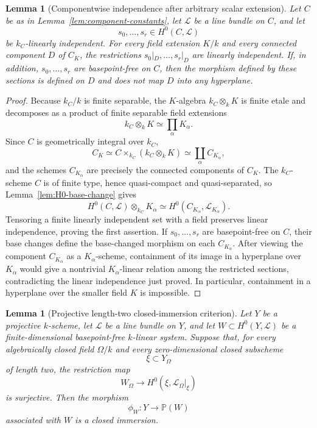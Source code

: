 \documentclass{lms}
\newtheorem{lemma}[theorem]{Lemma}
\newcommand{\PP}{\mathbb P}
\begin{document}
\begin{lemma}[Componentwise independence after arbitrary scalar extension]\label{lem:component-base-change}
Let $C$ be as in Lemma~\ref{lem:component-constants}, let $\mathcal L$ be a line bundle on $C$, and let
\[
        s_0,\ldots,s_r\in H^0(C,\mathcal L)
\]
be $k_C$-linearly independent.  For every field extension $K/k$ and every connected component $D$ of $C_K$, the restrictions $s_0|_D,\ldots,s_r|_D$ are linearly independent.  If, in addition, $s_0,\ldots,s_r$ are basepoint-free on $C$, then the morphism defined by these sections is defined on $D$ and does not map $D$ into any hyperplane.
\end{lemma}

\begin{proof}
Because $k_C/k$ is finite separable, the $K$-algebra $k_C\otimes_k K$ is finite etale and decomposes as a product of finite separable field extensions
\[
        k_C\otimes_k K\simeq \prod_\alpha K_\alpha .
\]
Since $C$ is geometrically integral over $k_C$,
\[
        C_K\simeq C\times_{k_C}(k_C\otimes_k K)
        \simeq \coprod_\alpha C_{K_\alpha},
\]
and the schemes $C_{K_\alpha}$ are precisely the connected components of $C_K$.  The $k_C$-scheme $C$ is of finite type, hence quasi-compact and quasi-separated, so Lemma~\ref{lem:H0-base-change} gives
\[
        H^0(C,\mathcal L)\otimes_{k_C}K_\alpha
        \simeq
        H^0(C_{K_\alpha},\mathcal L_{K_\alpha}).
\]
Tensoring a finite linearly independent set with a field preserves linear independence, proving the first assertion.  If $s_0,\ldots,s_r$ are basepoint-free on $C$, their base changes define the base-changed morphism on each $C_{K_\alpha}$.  After viewing the component $C_{K_\alpha}$ as a $K_\alpha$-scheme, containment of its image in a hyperplane over $K_\alpha$ would give a nontrivial $K_\alpha$-linear relation among the restricted sections, contradicting the linear independence just proved.  In particular, containment in a hyperplane over the smaller field $K$ is impossible.
\end{proof}

\begin{lemma}[Projective length-two closed-immersion criterion]\label{lem:linear-system-criterion}
Let $Y$ be a projective $k$-scheme, let $\mathcal L$ be a line bundle on $Y$, and let
$W\subset H^0(Y,\mathcal L)$ be a finite-dimensional basepoint-free $k$-linear system.  Suppose that, for every algebraically closed field $\Omega/k$ and every zero-dimensional closed subscheme
\[
        \xi\subset Y_\Omega
\]
of length two, the restriction map
\[
        W_\Omega\longrightarrow H^0(\xi,\mathcal L_\Omega|_\xi)
\]
is surjective.  Then the morphism
\[
        \phi_W:Y\longrightarrow \PP(W)
\]
associated with $W$ is a closed immersion.
\end{lemma}
\end{document}
